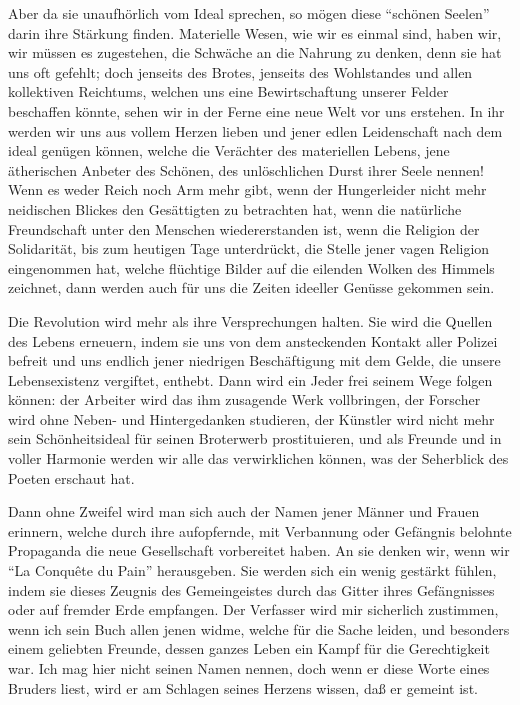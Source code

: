 \documentclass{scrbook}
\begin{document}
Aber da sie unaufhörlich vom Ideal sprechen, so mögen diese ``schönen Seelen'' darin ihre Stärkung finden. Materielle Wesen, wie wir es einmal sind, haben wir, wir müssen es zugestehen, die Schwäche an die Nahrung zu denken, denn sie hat uns oft gefehlt; doch jenseits des Brotes, jenseits des Wohlstandes und allen kollektiven Reichtums, welchen uns eine Bewirtschaftung unserer Felder beschaffen könnte, sehen wir in der Ferne eine neue Welt vor uns erstehen. In ihr werden wir uns aus vollem Herzen lieben und jener edlen Leidenschaft nach dem ideal genügen können, welche die Verächter des materiellen Lebens, jene ätherischen Anbeter des Schönen, des unlöschlichen Durst ihrer Seele nennen! Wenn es weder Reich noch Arm mehr gibt, wenn der Hungerleider nicht mehr neidischen Blickes den Gesättigten zu betrachten hat, wenn die natürliche Freundschaft unter den Menschen wiedererstanden ist, wenn die Religion der Solidarität, bis zum heutigen Tage unterdrückt, die Stelle jener vagen Religion eingenommen hat, welche flüchtige Bilder auf die eilenden Wolken des Himmels zeichnet, dann werden auch für uns die Zeiten ideeller Genüsse gekommen sein.

Die Revolution wird mehr als ihre Versprechungen halten. Sie wird die Quellen des Lebens erneuern, indem sie uns von dem ansteckenden Kontakt aller Polizei befreit und uns endlich jener niedrigen Beschäftigung mit dem Gelde, die unsere Lebensexistenz vergiftet, enthebt. Dann wird ein Jeder frei seinem Wege folgen können: der Arbeiter wird das ihm zusagende Werk vollbringen, der Forscher wird ohne Neben- und Hintergedanken studieren, der Künstler wird nicht mehr sein Schönheitsideal für seinen Broterwerb prostituieren, und als Freunde und in voller Harmonie werden wir alle das verwirklichen können, was der Seherblick des Poeten erschaut hat.

Dann ohne Zweifel wird man sich auch der Namen jener Männer und Frauen erinnern, welche durch ihre aufopfernde, mit Verbannung oder Gefängnis belohnte Propaganda die neue Gesellschaft vorbereitet haben. An sie denken wir, wenn wir ``La Conquête du Pain'' herausgeben. Sie werden sich ein wenig gestärkt fühlen, indem sie dieses Zeugnis des Gemeingeistes durch das Gitter ihres Gefängnisses oder auf fremder Erde empfangen. Der Verfasser wird mir sicherlich zustimmen, wenn ich sein Buch allen jenen widme, welche für die Sache leiden, und besonders einem geliebten Freunde, dessen ganzes Leben ein Kampf für die Gerechtigkeit war. Ich mag hier nicht seinen Namen nennen, doch wenn er diese Worte eines Bruders liest, wird er am Schlagen seines Herzens wissen, daß er gemeint ist.
\end{document}
